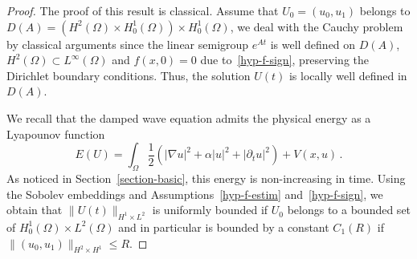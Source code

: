 \documentclass[AHL,Unicode,longabstracts]{cedram}
\newcommand{\grad}{\nabla}
\begin{document}
\begin{proof}
The proof of this result is classical. Assume that $U_0=(u_0,u_1)$ belongs to $D(A)=(H^2(\Omega)\times H^1_0(\Omega))\times H^1_0(\Omega)$, we deal with the Cauchy problem by classical arguments since the linear semigroup $e^{At}$ is well defined on $D(A)$, $H^2(\Omega)\subset L^\infty(\Omega)$ and $f(x,0)=0$ due to~\eqref{hyp-f-sign}, preserving the Dirichlet boundary conditions. Thus, the solution $U(t)$ is locally well defined in $D(A)$.

We recall that the damped wave equation admits the physical energy as a Lyapounov function
\[
E(U)=\int_\Omega \frac 12\left(|\grad u|^2+\alpha |u|^2 + |\partial_t u|^2\right) +
V(x,u)\,.
\]
As noticed in Section~\ref{section-basic}, this energy is non-increasing in time. Using the Sobolev embeddings and Assumptions~\eqref{hyp-f-estim} and~\eqref{hyp-f-sign}, we obtain that $\|U(t)\|_{H^1\times L^2}$ is uniformly bounded if $U_0$ belongs to a bounded set of $H^1_0(\Omega)\times L^2(\Omega)$ and in particular is bounded by a constant $C_1(R)$ if $\|(u_0,u_1)\|_{H^2\times H^1} \leq R$.


\end{proof}
\end{document}
